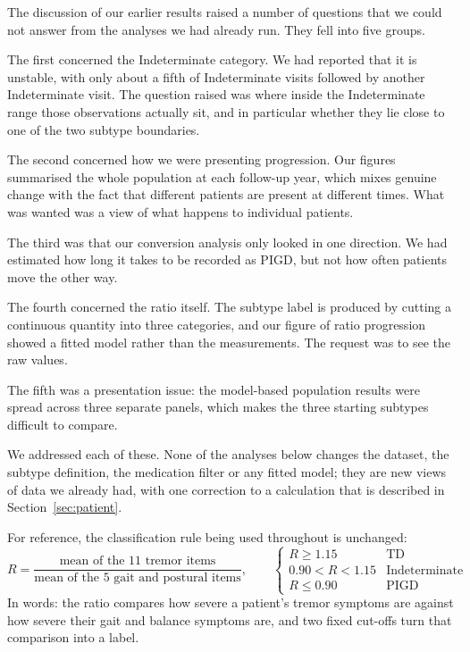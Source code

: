 \documentclass[11pt,a4paper]{article}
\begin{document}
The discussion of our earlier results raised a number of questions that we could
not answer from the analyses we had already run. They fell into five groups.

The first concerned the Indeterminate category. We had reported that it is
unstable, with only about a fifth of Indeterminate visits followed by another
Indeterminate visit. The question raised was where inside the Indeterminate range
those observations actually sit, and in particular whether they lie close to one
of the two subtype boundaries.

The second concerned how we were presenting progression. Our figures summarised
the whole population at each follow-up year, which mixes genuine change with the
fact that different patients are present at different times. What was wanted was
a view of what happens to individual patients.

The third was that our conversion analysis only looked in one direction. We had
estimated how long it takes to be recorded as PIGD, but not how often patients
move the other way.

The fourth concerned the ratio itself. The subtype label is produced by cutting a
continuous quantity into three categories, and our figure of ratio progression
showed a fitted model rather than the measurements. The request was to see the
raw values.

The fifth was a presentation issue: the model-based population results were
spread across three separate panels, which makes the three starting subtypes
difficult to compare.

We addressed each of these. None of the analyses below changes the dataset, the
subtype definition, the medication filter or any fitted model; they are new views
of data we already had, with one correction to a calculation that is described in
Section~\ref{sec:patient}.

For reference, the classification rule being used throughout is unchanged:
\[
  R = \frac{\text{mean of the 11 tremor items}}{\text{mean of the 5 gait and postural items}},
  \qquad
  \begin{cases}
    R \geq 1.15 & \text{TD} \\
    0.90 < R < 1.15 & \text{Indeterminate} \\
    R \leq 0.90 & \text{PIGD}
  \end{cases}
\]
In words: the ratio compares how severe a patient's tremor symptoms are against
how severe their gait and balance symptoms are, and two fixed cut-offs turn that
comparison into a label.
\end{document}
